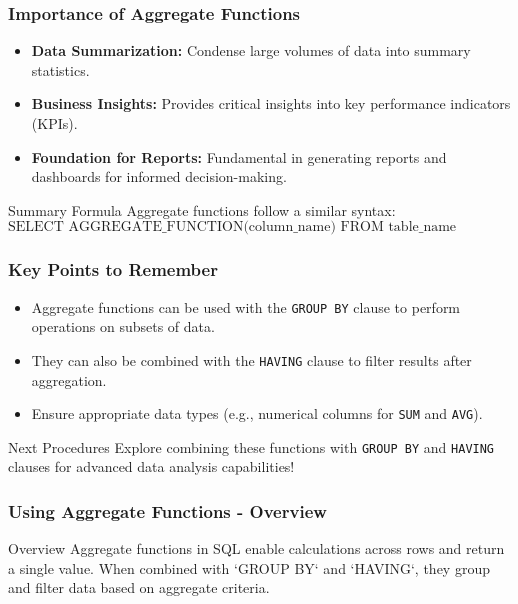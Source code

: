 \documentclass[aspectratio=169]{beamer}
\begin{document}
\begin{frame}[fragile]
    \frametitle{Importance of Aggregate Functions}
    \begin{itemize}
        \item \textbf{Data Summarization:} Condense large volumes of data into summary statistics.
        \item \textbf{Business Insights:} Provides critical insights into key performance indicators (KPIs).
        \item \textbf{Foundation for Reports:} Fundamental in generating reports and dashboards for informed decision-making.
    \end{itemize}
    \begin{block}{Summary Formula}
    Aggregate functions follow a similar syntax:
    \[
    \text{SELECT AGGREGATE\_FUNCTION(column\_name) FROM table\_name WHERE condition;}
    \]
    \end{block}
\end{frame}

\begin{frame}[fragile]
    \frametitle{Key Points to Remember}
    \begin{itemize}
        \item Aggregate functions can be used with the \texttt{GROUP BY} clause to perform operations on subsets of data.
        \item They can also be combined with the \texttt{HAVING} clause to filter results after aggregation.
        \item Ensure appropriate data types (e.g., numerical columns for \texttt{SUM} and \texttt{AVG}).
    \end{itemize}
    \begin{block}{Next Procedures}
        Explore combining these functions with \texttt{GROUP BY} and \texttt{HAVING} clauses for advanced data analysis capabilities!
    \end{block}
\end{frame}

\begin{frame}[fragile]
    \frametitle{Using Aggregate Functions - Overview}
    \begin{block}{Overview}
        Aggregate functions in SQL enable calculations across rows and return a single value. When combined with `GROUP BY` and `HAVING`, they group and filter data based on aggregate criteria.
    \end{block}
\end{frame}
\end{document}
